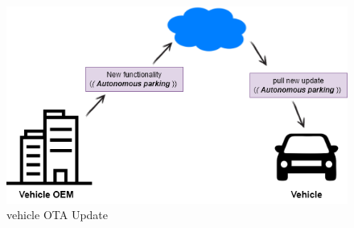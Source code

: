 \documentclass[
12pt,
oneside, 
onehalfspacing, 
nolistspacing, 
parskip, 
chapterinoneline, 
]{AASTCOMPUTER}
\begin{document}
\begin{figure}[!ht]
\centering
\includegraphics[scale=0.5]{Figures/1.png}
\caption[vehicle OTA Update]{vehicle OTA Update}
\label{fig:TCU}
\end{figure}

\newpage
\end{document}
